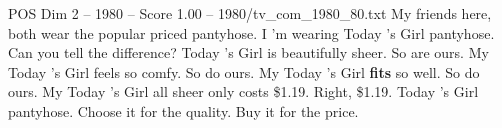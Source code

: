 \begin{textsample}{POS Dim 2 – 1980 – Score 1.00 – 1980/tv\_com\_1980\_80.txt}  \label{ex:f2_pos_066}
My friends here, both wear the popular priced pantyhose.
I 'm wearing Today 's Girl pantyhose.
Can you tell the difference?
Today 's Girl is beautifully sheer.
So are ours.
My Today 's Girl feels so comfy.
So do ours.
My Today 's Girl \textbf{fits} so well.
So do ours.
My Today 's Girl all sheer only costs \$1.19.
Right, \$1.19.
Today 's Girl pantyhose.
Choose it for the quality.
Buy it for the price.

\end{textsample}
